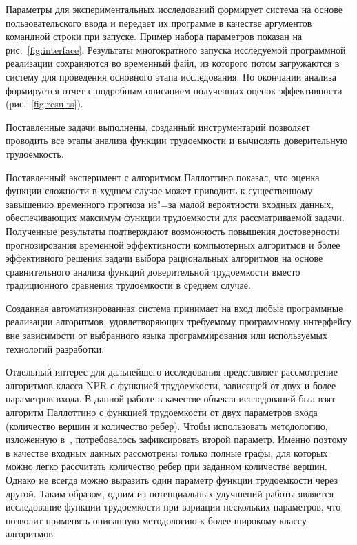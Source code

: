 \documentclass[a4paper, article, 14pt]{extarticle}
\begin{document}
Параметры для экспериментальных исследований формирует система на основе пользовательского ввода и передает их программе в качестве аргументов командной строки при запуске. Пример набора параметров показан на рис.~\ref{fig:interface}. Результаты многократного запуска исследуемой программной реализации сохраняются во временный файл, из которого потом загружаются в систему для проведения основного этапа исследования. По окончании анализа формируется отчет с подробным описанием полученных оценок эффективности (рис.~\ref{fig:results}).

\label{sec:conclusion}

Поставленные задачи выполнены, созданный инструментарий позволяет проводить все этапы анализа функции трудоемкости и вычислять доверительную трудоемкость.

Поставленный эксперимент с алгоритмом Паллоттино показал, что оценка функции сложности в худшем случае может приводить к существенному завышению временного прогноза из"=за малой вероятности входных данных, обеспечивающих максимум функции трудоемкости для рассматриваемой задачи. Полученные результаты подтверждают возможность повышения достоверности прогнозирования временной эффективности компьютерных алгоритмов и более эффективного решения задачи выбора рациональных алгоритмов на основе сравнительного анализа функций доверительной трудоемкости вместо традиционного сравнения трудоемкости в среднем случае.

Созданная автоматизированная система принимает на вход любые программные реализации алгоритмов, удовлетворяющих требуемому программному интерфейсу вне зависимости от выбранного языка программирования или используемых технологий разработки.

Отдельный интерес для дальнейшего исследования представляет рассмотрение алгоритмов класса NPR с функцией трудоемкости, зависящей от двух и более параметров входа. В данной работе в качестве объекта исследований был взят алгоритм Паллоттино с функцией трудоемкости от двух параметров входа (количество вершин и количество ребер). Чтобы использовать методологию, изложенную в~\cite{petrushyn_ulyanov_analysis}, потребовалось зафиксировать второй параметр. Именно поэтому в качестве входных данных рассмотрены только полные графы, для которых можно легко рассчитать количество ребер при заданном количестве вершин. Однако не всегда можно выразить один параметр функции трудоемкости через другой. Таким образом, одним из потенциальных улучшений работы является исследование функции трудоемкости при вариации нескольких параметров, что позволит применять описанную методологию к более широкому классу алгоритмов.
\end{document}
